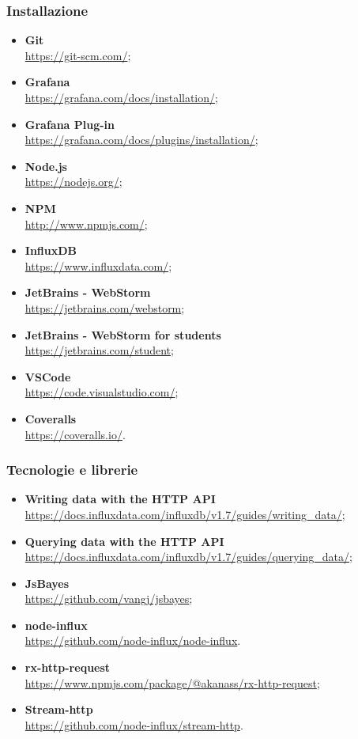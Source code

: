 \subsubsection{Installazione}
\begin{itemize}
	\item{\textbf{Git}\\
		\url{https://git-scm.com/}};
	\item{\textbf{Grafana}\\
		\url{https://grafana.com/docs/installation/}};
	\item{\textbf{Grafana Plug-in}\\
		\url{https://grafana.com/docs/plugins/installation/}};
	\item{\textbf{Node.js}\\
		\url{https://nodejs.org/}};
	\item{\textbf{NPM}\\
		\url{http://www.npmjs.com/}};
	\item{\textbf{InfluxDB}\\
		\url{https://www.influxdata.com/}};
	\item{\textbf{JetBrains - WebStorm}\\
		\url{https://jetbrains.com/webstorm}};
	\item{\textbf{JetBrains - WebStorm for students}\\
		\url{https://jetbrains.com/student}};
	\item{\textbf{VSCode}\\
		\url{https://code.visualstudio.com/}};
	\item{\textbf{Coveralls}\\
		\url{https://coveralls.io/}}.
\end{itemize}

\subsubsection{Tecnologie e librerie}
\begin{itemize}
	\item{\textbf{Writing data with the HTTP API}\\
		\url{https://docs.influxdata.com/influxdb/v1.7/guides/writing_data/}};
	\item{\textbf{Querying data with the HTTP API}\\
		\url{https://docs.influxdata.com/influxdb/v1.7/guides/querying_data/}};
	\item{\textbf{JsBayes}\\
		\url{https://github.com/vangj/jsbayes}};
	\item{\textbf{node-influx}\\
		\url{https://github.com/node-influx/node-influx}}.
	\item{\textbf{rx-http-request}\\
		\url{https://www.npmjs.com/package/@akanass/rx-http-request}};
	\item{\textbf{Stream-http}\\
		\url{https://github.com/node-influx/stream-http}}.
\end{itemize}

